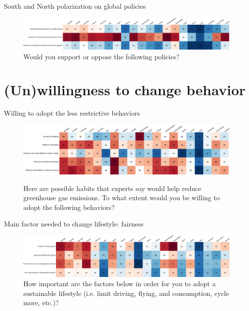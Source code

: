 \begin{frame}{South and North polarization on global policies}%
	\begin{figure}[h!]
	\centering
	\caption{Would you support or oppose the following policies?}
	\vspace{-.2cm}
	\includegraphics[width=\textwidth]{../figures/country_comparison/global_policies_positive_countries.png}
	\end{figure}
\end{frame}	


\section{(Un)willingness to change behavior}
\begin{frame}{Willing to adopt the less restrictive behaviors}%
	\begin{figure}[h!]
	\centering
	\caption{Here are possible habits that experts say would help reduce greenhouse gas emissions.
	To what extent would you be willing to adopt the following behaviors?}
	\includegraphics[width=\textwidth]{../figures/country_comparison/willing_positive_countries.png} \\
	\end{figure}
\end{frame}
	
\begin{frame}{Main factor needed to change lifestyle: fairness}%
	\begin{figure}[h!]
	\centering
	\caption{How important are the factors below in order for you to adopt a sustainable lifestyle (i.e. limit driving, flying, and consumption, cycle more, etc.)?}
	\includegraphics[width=\textwidth]{../figures/country_comparison/condition_positive_countries.png}
	\end{figure}
\end{frame}
	

